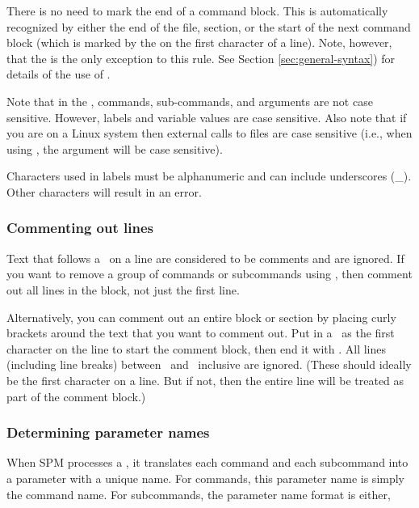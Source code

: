 There is no need to mark the end of a command block. This is automatically recognized by either the end of the file, section, or the start of the next command block (which is marked by the \command{} on the first character of a line). Note, however, that the  is the only exception to this rule. See Section \ref{sec:general-syntax}) for details of the use of . 

Note that in the \config, commands, sub-commands, and arguments are not case sensitive. However, labels and variable values are case sensitive. Also note that if you are on a Linux system then external calls to files are case sensitive (i.e., when using  , the argument  will be case sensitive). 

Characters used in labels must be alphanumeric and can include underscores (\_). Other characters will result in an error.

\subsubsection{Commenting out lines}

Text that follows a \commentline\ on a line are considered to be comments and are ignored. If you want to remove a group of commands or subcommands using \commentline, then comment out all lines in the block, not just the first line. 

Alternatively, you can comment out an entire block or section by placing curly brackets around the text that you want to comment out. Put in a \commentstart\ as the first character on the line to start the comment block, then end it with \commentend. All lines (including line breaks) between \commentstart\ and \commentend\ inclusive are ignored. (These should ideally be the first character on a line. But if not, then the entire line will be treated as part of the comment block.)

\subsubsection{Determining parameter names\label{sec:parameter-names}}

When SPM processes a \config, it translates each command and each subcommand into a parameter with a unique name. For commands, this parameter name is simply the command name. For subcommands, the parameter name format is either, 

